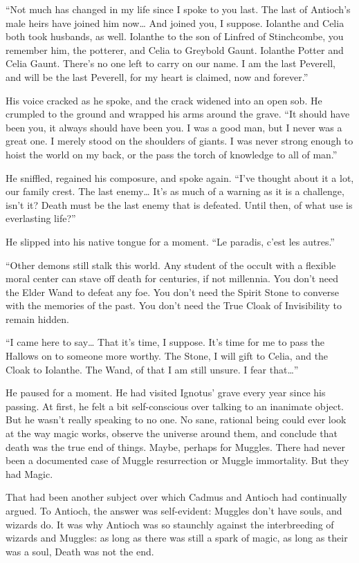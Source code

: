 “Not much has changed in my life since I spoke to you last. The last of Antioch’s male heirs have joined him now… And joined you, I suppose. Iolanthe and Celia both took husbands, as well. Iolanthe to the son of Linfred of Stinchcombe, you remember him, the potterer, and Celia to Greybold Gaunt. Iolanthe Potter and Celia Gaunt. There’s no one left to carry on our name. I am the last Peverell, and will be the last Peverell, for my heart is claimed, now and forever.”

His voice cracked as he spoke, and the crack widened into an open sob. He crumpled to the ground and wrapped his arms around the grave. “It should have been you, it always should have been you. I was a good man, but I never was a great one. I merely stood on the shoulders of giants. I was never strong enough to hoist the world on my back, or the pass the torch of knowledge to all of man.”

He sniffled, regained his composure, and spoke again. “I’ve thought about it a lot, our family crest. The last enemy… It’s as much of a warning as it is a challenge, isn’t it? Death must be the last enemy that is defeated. Until then, of what use is everlasting life?”

He slipped into his native tongue for a moment. “Le paradis, c’est les autres.”

“Other demons still stalk this world. Any student of the occult with a flexible moral center can stave off death for centuries, if not millennia. You don’t need the Elder Wand to defeat any foe. You don’t need the Spirit Stone to converse with the memories of the past. You don’t need the True Cloak of Invisibility to remain hidden.

“I came here to say… That it’s time, I suppose. It’s time for me to pass the Hallows on to someone more worthy. The Stone, I will gift to Celia, and the Cloak to Iolanthe. The Wand, of that I am still unsure. I fear that…”

He paused for a moment. He had visited Ignotus’ grave every year since his passing. At first, he felt a bit self-conscious over talking to an inanimate object. But he wasn’t really speaking to no one. No sane, rational being could ever look at the way magic works, observe the universe around them, and conclude that death was the true end of things. Maybe, perhaps for Muggles. There had never been a documented case of Muggle resurrection or Muggle immortality. But they had Magic.

That had been another subject over which Cadmus and Antioch had continually argued. To Antioch, the answer was self-evident: Muggles don’t have souls, and wizards do. It was why Antioch was so staunchly against the interbreeding of wizards and Muggles: as long as there was still a spark of magic, as long as their was a soul, Death was not the end.

